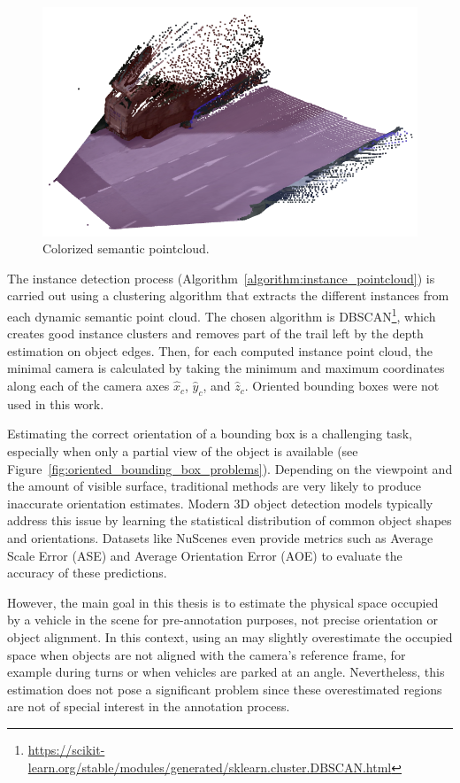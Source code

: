 \begin{figure}[h!]
    \centering
    \includegraphics[width=0.7\linewidth]{images/methodology/pcd_semantic.png}
    \caption{Colorized semantic pointcloud.}
    \label{fig:semantic_pointcloud}
\end{figure}

The instance detection process (Algorithm~\ref{algorithm:instance_pointcloud}) is carried out using a clustering algorithm that extracts the different instances from each dynamic semantic point cloud. The chosen algorithm is DBSCAN\footnote{\url{https://scikit-learn.org/stable/modules/generated/sklearn.cluster.DBSCAN.html}}, which creates good instance clusters and removes part of the trail left by the depth estimation on object edges. Then, for each computed instance point cloud, the minimal camera  is calculated by taking the minimum and maximum coordinates along each of the camera axes $\hat{x}_c$, $\hat{y}_c$, and $\hat{z}_c$. Oriented bounding boxes were not used in this work.

Estimating the correct orientation of a bounding box is a challenging task, especially when only a partial view of the object is available (see Figure~\ref{fig:oriented_bounding_box_problems}). Depending on the viewpoint and the amount of visible surface, traditional methods are very likely to produce inaccurate orientation estimates. Modern 3D object detection models typically address this issue by learning the statistical distribution of common object shapes and orientations. Datasets like NuScenes even provide metrics such as Average Scale Error (ASE) and Average Orientation Error (AOE) to evaluate the accuracy of these predictions.

However, the main goal in this thesis is to estimate the physical space occupied by a vehicle in the scene for pre-annotation purposes, not precise orientation or object alignment. In this context, using an  may slightly overestimate the occupied space when objects are not aligned with the camera's reference frame, for example during turns or when vehicles are parked at an angle. Nevertheless, this estimation does not pose a significant problem since these overestimated regions are not of special interest in the annotation process.

